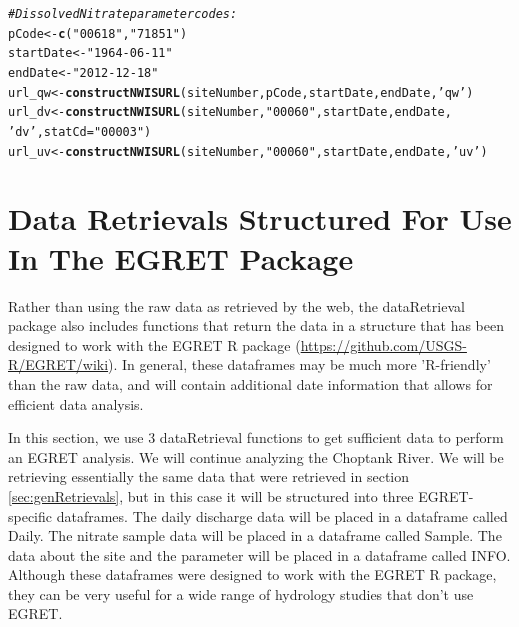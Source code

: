 \documentclass[a4paper,11pt]{article}\usepackage[]{graphicx}\usepackage[]{color}
\makeatletter
\newcommand{\hlstr}[1]{\textcolor[rgb]{0.192,0.494,0.8}{#1}}%
\newcommand{\hlcom}[1]{\textcolor[rgb]{0.678,0.584,0.686}{\textit{#1}}}%
\newcommand{\hlstd}[1]{\textcolor[rgb]{0.345,0.345,0.345}{#1}}%
\newcommand{\hlkwb}[1]{\textcolor[rgb]{0.69,0.353,0.396}{#1}}%
\newcommand{\hlkwc}[1]{\textcolor[rgb]{0.333,0.667,0.333}{#1}}%
\newcommand{\hlkwd}[1]{\textcolor[rgb]{0.737,0.353,0.396}{\textbf{#1}}}%
\newenvironment{kframe}{%
 \def\at@end@of@kframe{}%
 \ifinner\ifhmode%
  \def\at@end@of@kframe{\end{minipage}}%
  \begin{minipage}{\columnwidth}%
 \fi\fi%
 \def\FrameCommand##1{\hskip\@totalleftmargin \hskip-\fboxsep
 \colorbox{shadecolor}{##1}\hskip-\fboxsep
     \hskip-\linewidth \hskip-\@totalleftmargin \hskip\columnwidth}%
 \MakeFramed {\advance\hsize-\width
   \@totalleftmargin\z@ \linewidth\hsize
   \@setminipage}}%
 {\par\unskip\endMakeFramed%
 \at@end@of@kframe}
\newenvironment{knitrout}{}{} %
\makeatother
\begin{document}
\begin{knitrout}
\color{fgcolor}\begin{kframe}
\begin{alltt}
\hlcom{# Dissolved Nitrate parameter codes:}
\hlstd{pCode} \hlkwb{<-} \hlkwd{c}\hlstd{(}\hlstr{"00618"}\hlstd{,}\hlstr{"71851"}\hlstd{)}
\hlstd{startDate} \hlkwb{<-} \hlstr{"1964-06-11"}
\hlstd{endDate} \hlkwb{<-} \hlstr{"2012-12-18"}
\hlstd{url_qw} \hlkwb{<-} \hlkwd{constructNWISURL}\hlstd{(siteNumber,pCode,startDate,endDate,}\hlstr{'qw'}\hlstd{)}
\hlstd{url_dv} \hlkwb{<-} \hlkwd{constructNWISURL}\hlstd{(siteNumber,}\hlstr{"00060"}\hlstd{,startDate,endDate,}
                           \hlstr{'dv'}\hlstd{,}\hlkwc{statCd}\hlstd{=}\hlstr{"00003"}\hlstd{)}
\hlstd{url_uv} \hlkwb{<-} \hlkwd{constructNWISURL}\hlstd{(siteNumber,}\hlstr{"00060"}\hlstd{,startDate,endDate,}\hlstr{'uv'}\hlstd{)}
\end{alltt}
\end{kframe}
\end{knitrout}

\FloatBarrier

\section{Data Retrievals Structured For Use In The EGRET Package}
\label{sec:EGRETdfs}
Rather than using the raw data as retrieved by the web, the dataRetrieval package also includes functions that return the data in a structure that has been designed to work with the EGRET R package (\url{https://github.com/USGS-R/EGRET/wiki}). In general, these dataframes may be much more 'R-friendly' than the raw data, and will contain additional date information that allows for efficient data analysis.

In this section, we use 3 dataRetrieval functions to get sufficient data to perform an EGRET analysis.  We will continue analyzing the Choptank River. We will be retrieving essentially the same data that were retrieved in section \ref{sec:genRetrievals}, but in this case it will be structured into three EGRET-specific dataframes.  The daily discharge data will be placed in a dataframe called Daily.  The nitrate sample data will be placed in a dataframe called Sample.  The data about the site and the parameter will be placed in a dataframe called INFO.  Although these dataframes were designed to work with the EGRET R package, they can be very useful for a wide range of hydrology studies that don't use EGRET.
\end{document}
